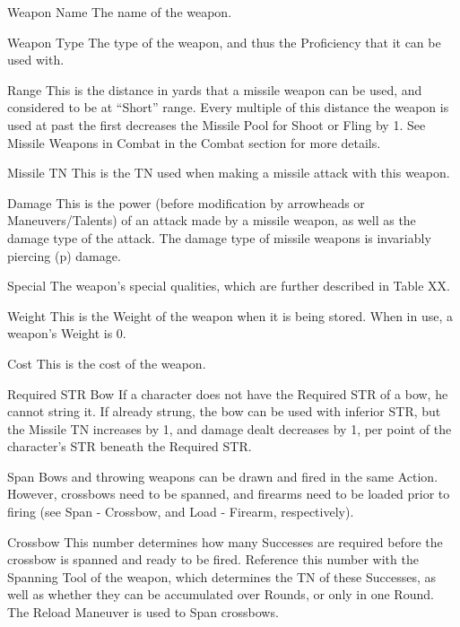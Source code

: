 \documentclass[oneside,11pt,english]{book}
\begin{document}
 

Weapon Name 
The name of the weapon. 

 

Weapon Type 
The type of the weapon, and thus the Proficiency that it can be used with. 

 

Range 
This is the distance in yards that a missile weapon can be used, and considered to be at “Short” range. 
Every multiple of this distance the weapon is used at past the first decreases the Missile Pool for Shoot or 
Fling by 1. See Missile Weapons in Combat in the Combat section for more details. 


 

Missile TN 
This is the TN used when making a missile attack with this weapon. 

 

Damage 
This is the power (before modification by arrowheads or Maneuvers/Talents) of an attack made by a 
missile weapon, as well as the damage type of the attack. The damage type of missile weapons is 
invariably piercing (p) damage. 

 

Special 
The weapon’s special qualities, which are further described in Table XX. 

 

Weight 
This is the Weight of the weapon when it is being stored. When in use, a weapon’s Weight is 0. 

 

Cost 
This is the cost of the weapon. 

 

Required STR 
Bow 
If a character does not have the Required STR of a bow, he cannot string it. If already strung, the bow can 
be used with inferior STR, but the Missile TN increases by 1, and damage dealt decreases by 1, per point 
of the character’s STR beneath the Required STR. 

 

Span 
Bows and throwing weapons can be drawn and fired in the same Action. However, crossbows need to be 
spanned, and firearms need to be loaded prior to firing (see Span - Crossbow, and Load - Firearm, 
respectively). 

 

Crossbow 
This number determines how many Successes are required before the crossbow is spanned and ready to 
be fired. Reference this number with the Spanning Tool of the weapon, which determines the TN of these 
Successes, as well as whether they can be accumulated over Rounds, or only in one Round. The Reload 
Maneuver is used to Span crossbows. 
\end{document}
